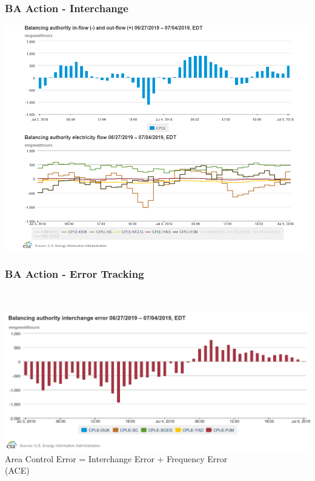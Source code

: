 \documentclass[14pt, unknownkeysallowed]{beamer}
\begin{document}
\begin{frame}
\frametitle{BA Action - Interchange} %
\begin{center}
\includegraphics[height=.82\textheight]{BAinterchange} {\tiny \cite{BAinformation} }%
\end{center}

\end{frame}
\begin{frame}
\frametitle{BA Action - Error Tracking} \ \vspace{.5em}

{\centering
{\includegraphics[height=.6\textheight]{chart4}} {\tiny \cite{BAinformation} }%
}
{\footnotesize
Area Control Error = Interchange Error + Frequency Error \\ (ACE)
}
\end{frame}
\end{document}
